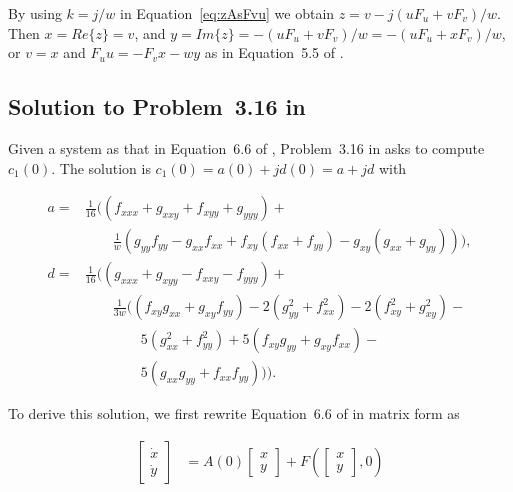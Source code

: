 \documentclass{article}
\theoremstyle{lemma}
\begin{document}
By using $k=j/w$ in Equation~\ref{eq:zAsFvu} we obtain $z=v-j(uF_u+vF_v)/w$.
Then $x=Re\{z\}=v$, and $y=Im\{z\}=-(uF_u+vF_v)/w=-(uF_u+xF_v)/w$, or $v=x$
and $F_uu=-F_vx-wy$ as in Equation~5.5 of
\citet{izhikevich07}.

\subsection{Solution to Problem~3.16 in \citet{kuznetsov04}}
\label{sec:solutionProblem3.16InKuznetsov04}

Given a system as that in Equation~6.6 of \citet{izhikevich07}, Problem~3.16 in \citet{kuznetsov04}
asks to compute $c_1(0)$. The solution is $c_1(0)=a(0)+jd(0)=a+jd$ with

\begin{align}
a=&\frac{1}{16}((f_{xxx}+g_{xxy}+f_{xyy}+g_{yyy})+\nonumber\\
&\qquad\frac{1}{w}(g_{yy}f_{yy}-g_{xx}f_{xx}+f_{xy}(f_{xx}+f_{yy})-g_{xy}(g_{xx}+g_{yy}))),\label{eq:a}\\
d=&\frac{1}{16}((g_{xxx}+g_{xyy}-f_{xxy}-f_{yyy})+\nonumber\\
&\qquad\frac{1}{3w}((f_{xy}g_{xx}+g_{xy}f_{yy})-2(g_{yy}^2+f_{xx}^2)-2(f_{xy}^2+g_{xy}^2)-\nonumber\\
&\qquad\qquad5(g_{xx}^2+f_{yy}^2)+5(f_{xy}g_{yy}+g_{xy}f_{xx})-\nonumber\\
&\qquad\qquad5(g_{xx}g_{yy}+f_{xx}f_{yy})))\label{eq:d}.
\end{align}

To derive this solution, we first rewrite
Equation~6.6 of \citet{izhikevich07} in matrix form as

\begin{align}
\left[\begin{array}{c}
        \dot{x}\\
        \dot{y}
       \end{array}\right]&= A(0)\left[\begin{array}{c}
                                      x\\
                                      y
                                     \end{array}\right]+
                           F\left(\left[\begin{array}{c}
                                         x\\
                                         y
                                        \end{array}\right],0\right)
\label{eq:6.6MatrixForm}
\end{align}
\end{document}

